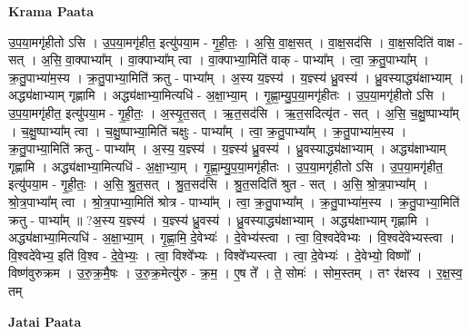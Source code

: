 \documentclass[17pt]{extarticle}
\begin{document}
\textbf{Krama Paata} \newline

उ॒प॒या॒मगृ॑हीतो ऽसि । उ॒प॒या॒मगृ॑हीत॒ इत्यु॑पया॒म - गृ॒ही॒तः॒ । अ॒सि॒ वा॒क्ष॒सत् । वा॒क्ष॒सद॑सि । वा॒क्ष॒सदिति॑ वाक्ष - सत् । अ॒सि॒ वा॒क्पाभ्या᳚म् । वा॒क्पाभ्या᳚म् त्वा । वा॒क्पाभ्या॒मिति॑ वाक् - पाभ्या᳚म् । त्वा॒ क्र॒तु॒पाभ्या᳚म् । क्र॒तु॒पाभ्या॑म॒स्य । क्र॒तु॒पाभ्या॒मिति॑ क्रतु - पाभ्या᳚म् । अ॒स्य य॒ज्ञ्स्य॑ । य॒ज्ञ्स्य॑ ध्रु॒वस्य॑ । ध्रु॒वस्याद्ध्य॑क्षाभ्याम् । अद्ध्य॑क्षाभ्याम् गृह्णामि । अद्ध्य॑क्षाभ्या॒मित्यधि॑ - अ॒क्षा॒भ्या॒म् । गृ॒ह्णा॒म्यु॒प॒या॒मगृ॑हीतः । उ॒प॒या॒मगृ॑हीतो ऽसि । उ॒प॒या॒मगृ॑हीत॒ इत्यु॑पया॒म - गृ॒ही॒तः॒ । अ॒स्यृ॒त॒सत् । ऋ॒त॒सद॑सि । ऋ॒त॒सदित्यृ॑त - सत् । अ॒सि॒ च॒क्षु॒ष्पाभ्या᳚म् । च॒क्षु॒ष्पाभ्या᳚म् त्वा । च॒क्षु॒ष्पाभ्या॒मिति॑ चक्षुः - पाभ्या᳚म् । त्वा॒ क्र॒तु॒पाभ्या᳚म् । क्र॒तु॒पाभ्या॑म॒स्य । क्र॒तु॒पाभ्या॒मिति॑ क्रतु - पाभ्या᳚म् । अ॒स्य॒ य॒ज्ञ्स्य॑ । य॒ज्ञ्स्य॑ ध्रु॒वस्य॑ । ध्रु॒वस्याद्ध्य॑क्षाभ्याम् । अद्ध्य॑क्षाभ्याम् गृह्णामि । अद्ध्य॑क्षाभ्या॒मित्यधि॑ - अ॒क्षा॒भ्या॒म् । गृ॒ह्णा॒म्यु॒प॒या॒मगृ॑हीतः । उ॒प॒या॒मगृ॑हीतो ऽसि । उ॒प॒या॒मगृ॑हीत॒ इत्यु॑पया॒म - गृ॒ही॒तः॒ । अ॒सि॒ श्रु॒त॒सत् । श्रु॒त॒सद॑सि । श्रु॒त॒सदिति॑ श्रुत - सत् । अ॒सि॒ श्रो॒त्र॒पाभ्या᳚म् । श्रो॒त्र॒पाभ्या᳚म् त्वा । श्रो॒त्र॒पाभ्या॒मिति॑ श्रोत्र - पाभ्या᳚म् । त्वा॒ क्र॒तु॒पाभ्या᳚म् । क्र॒तु॒पाभ्या॑म॒स्य । क्र॒तु॒पाभ्या॒मिति॑ क्रतु - पाभ्या᳚म् ॥ ?अ॒स्य य॒ज्ञ्स्य॑ । य॒ज्ञ्स्य॑ ध्रु॒वस्य॑ । ध्रु॒वस्याद्ध्य॑क्षाभ्याम् । अद्ध्य॑क्षाभ्याम् गृह्णामि । अद्ध्य॑क्षाभ्या॒मित्यधि॑ - अ॒क्षा॒भ्या॒म् । गृ॒ह्णा॒मि॒ दे॒वेभ्यः॑ । दे॒वेभ्य॑स्त्वा । त्वा॒ वि॒श्वदे॑वेभ्यः । वि॒श्वदे॑वेभ्यस्त्वा । वि॒श्वदे॑वेभ्य॒ इति॑ वि॒श्व - दे॒वे॒भ्यः॒ । त्वा॒ विश्वे᳚भ्यः । विश्वे᳚भ्यस्त्वा । त्वा॒ दे॒वेभ्यः॑ । दे॒वेभ्यो॒ विष्णो᳚ । विष्ण॑वुरुक्रम । उ॒रु॒क्र॒मै॒षः । उ॒रु॒क्र॒मेत्यु॑रु - क्र॒म॒ । ए॒ष ते᳚ । ते॒ सोमः॑ । सोम॒स्तम् । तꣳ र॑क्षस्व । र॒क्ष॒स्व॒ तम् \newline

\textbf{Jatai Paata} \newline
\end{document}
